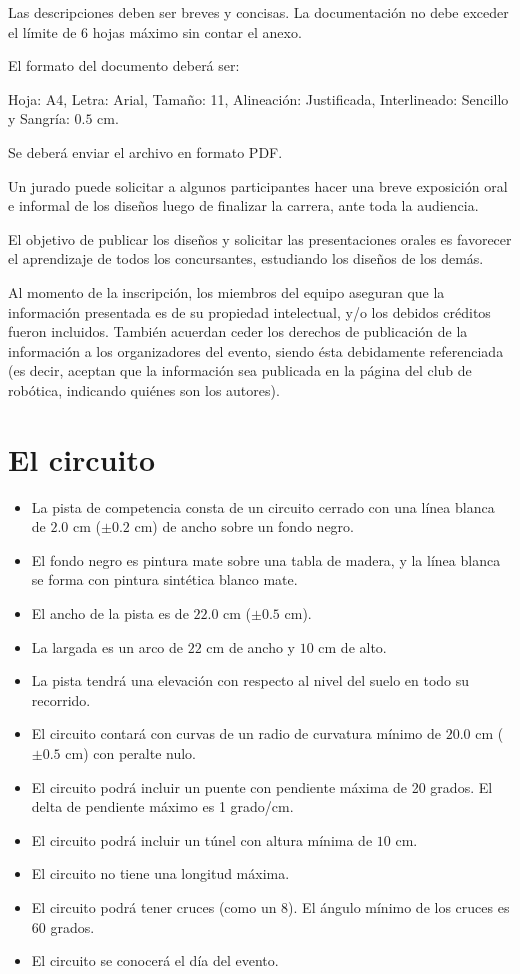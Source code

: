 \documentclass[a4paper,11pt]{article}
\newcommand{\cm}{\ensuremath{\mbox{~cm}}}
\begin{document}
Las descripciones deben ser breves y concisas. La documentación no debe exceder el límite de 6 hojas máximo sin contar el anexo. 

El formato del documento deberá ser: 

Hoja: A4, Letra: Arial, Tamaño: 11, Alineación: Justificada, Interlineado: Sencillo y Sangría: $0.5\cm$. 

Se deberá enviar el archivo en formato PDF.

Un jurado puede solicitar a algunos participantes hacer una breve exposición oral e informal de los diseños luego de finalizar la carrera, ante toda la audiencia.

El objetivo de publicar los diseños y solicitar las presentaciones orales es favorecer el aprendizaje de todos los concursantes, estudiando los diseños de los demás.

Al momento de la inscripción, los miembros del equipo aseguran que la información presentada es de su propiedad intelectual, y/o los debidos créditos fueron incluidos. También acuerdan ceder los derechos de publicación de la información a los organizadores del evento, siendo ésta debidamente referenciada (es decir, aceptan que la información sea publicada en la página del club de robótica, indicando quiénes son los autores).

\section*{El circuito}
\begin{itemize}
  \item La pista de competencia consta de un circuito cerrado con una línea blanca de $2.0\cm$ ($\pm 0.2\cm$) de ancho sobre un fondo negro.
  \item El fondo negro es pintura mate sobre una tabla de madera, y la línea blanca se forma con pintura sintética blanco mate.
  \item El ancho de la pista es de $22.0\cm$ ($\pm0.5\cm$).
  \item La largada es un arco de $22\cm$ de ancho y $10\cm$ de alto.
  \item La pista tendrá una elevación con respecto al nivel del suelo en todo su recorrido.
  \item El circuito contará con curvas de un radio de curvatura mínimo de $20.0\cm$ ($\pm 0.5\cm$) con peralte nulo.
  \item El circuito podrá incluir un puente con pendiente máxima de 20 grados. El delta de pendiente máximo es 1 grado/cm.
  \item El circuito podrá incluir un túnel con altura mínima de $10\cm$.
  \item El circuito no tiene una longitud máxima.
  \item El circuito podrá tener cruces (como un 8). El ángulo mínimo de los cruces es 60 grados.
  \item El circuito se conocerá el día del evento.
\end{itemize}
\end{document}
